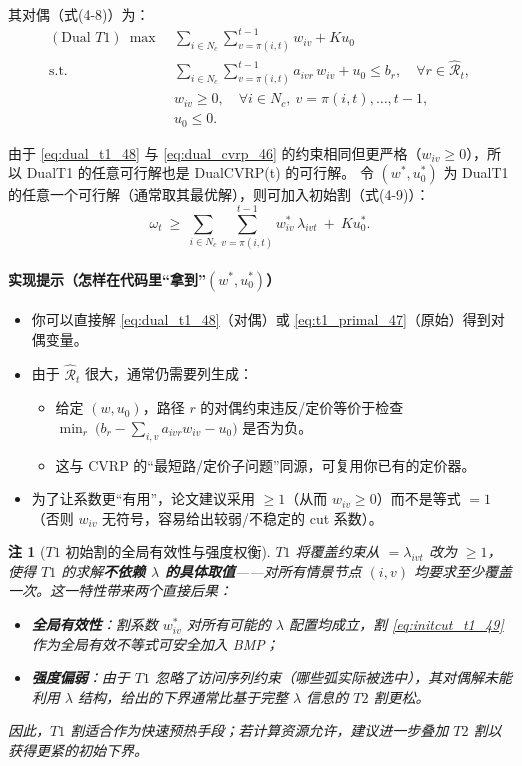 \documentclass{article}
\newtheorem{remark}{注}
\begin{document}
其对偶（式(4-8)）为：
\begin{equation}
\begin{aligned}
(\text{Dual }T1)\ \max\ &\sum_{i\in N_c}\sum_{v=\pi(i,t)}^{t-1} w_{iv}+K u_0\\
\text{s.t.}\ &\sum_{i\in N_c}\sum_{v=\pi(i,t)}^{t-1} a_{ivr}\,w_{iv}+u_0\le b_r,\quad \forall r\in\hat{\mathcal R}_t,\\
&w_{iv}\ge 0,\quad \forall i\in N_c,\ v=\pi(i,t),\dots,t-1,\\
&u_0\le 0.
\end{aligned}
\label{eq:dual_t1_48}
\end{equation}

由于 \eqref{eq:dual_t1_48} 与 \eqref{eq:dual_cvrp_46} 的约束相同但更严格（$w_{iv}\ge 0$），所以 DualT1 的任意可行解也是 DualCVRP(t) 的可行解。
令 $(w^*,u_0^*)$ 为 DualT1 的任意一个可行解（通常取其最优解），则可加入初始割（式(4-9)）：
\begin{equation}
\omega_t\ \ge\ \sum_{i\in N_c}\sum_{v=\pi(i,t)}^{t-1} w_{iv}^*\,\lambda_{ivt}\ +\ K u_0^*.
\label{eq:initcut_t1_49}
\end{equation}

\paragraph{实现提示（怎样在代码里“拿到”$(w^*,u_0^*)$）}
\begin{itemize}[leftmargin=2em]
  \item 你可以直接解 \eqref{eq:dual_t1_48}（对偶）或 \eqref{eq:t1_primal_47}（原始）得到对偶变量。
  \item 由于 $\hat{\mathcal R}_t$ 很大，通常仍需要列生成：
    \begin{itemize}[leftmargin=2em]
      \item 给定 $(w,u_0)$，路径 $r$ 的对偶约束违反/定价等价于检查\;
      $\min_{r}\ \bigl(b_r-\sum_{i,v}a_{ivr}w_{iv}-u_0\bigr)$ 是否为负。
      \item 这与 CVRP 的“最短路/定价子问题”同源，可复用你已有的定价器。
    \end{itemize}
  \item 为了让系数更“有用”，论文建议采用 $\ge 1$（从而 $w_{iv}\ge 0$）而不是等式 $=1$（否则 $w_{iv}$ 无符号，容易给出较弱/不稳定的 cut 系数）。
\end{itemize}

\begin{remark}[$T1$ 初始割的全局有效性与强度权衡]
$T1$ 将覆盖约束从 $=\lambda_{ivt}$ 改为 $\ge 1$，使得 $T1$ 的求解\textbf{不依赖 $\lambda$ 的具体取值}——对所有情景节点 $(i,v)$ 均要求至少覆盖一次。这一特性带来两个直接后果：
\begin{itemize}
  \item \textbf{全局有效性}：割系数 $w^*_{iv}$ 对所有可能的 $\lambda$ 配置均成立，割 \eqref{eq:initcut_t1_49} 作为全局有效不等式可安全加入 BMP；
  \item \textbf{强度偏弱}：由于 $T1$ 忽略了访问序列约束（哪些弧实际被选中），其对偶解未能利用 $\lambda$ 结构，给出的下界通常比基于完整 $\lambda$ 信息的 $T2$ 割更松。
\end{itemize}
因此，$T1$ 割适合作为快速预热手段；若计算资源允许，建议进一步叠加 $T2$ 割以获得更紧的初始下界。
\end{remark}
\end{document}
